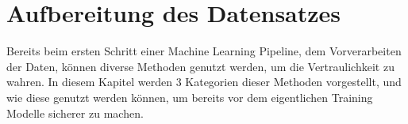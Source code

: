 \section{Aufbereitung des Datensatzes}

Bereits beim ersten Schritt einer Machine Learning Pipeline, dem Vorverarbeiten der Daten, können diverse Methoden genutzt werden, um die Vertraulichkeit zu wahren.
In diesem Kapitel werden 3 Kategorien dieser Methoden vorgestellt, und wie diese genutzt werden können, um bereits vor dem eigentlichen Training Modelle sicherer zu machen.




